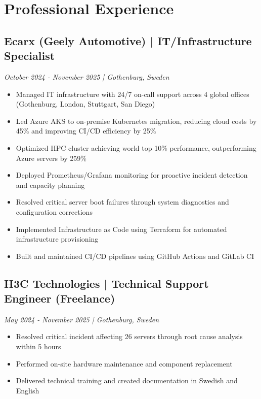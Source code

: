\documentclass[11pt,a4paper]{article}
\begin{document}
\section*{Professional Experience}

\subsection*{Ecarx (Geely Automotive) | IT/Infrastructure Specialist}
\textit{October 2024 - November 2025 | Gothenburg, Sweden}

\begin{itemize}[leftmargin=*, itemsep=2pt]
\item Managed IT infrastructure with 24/7 on-call support across 4 global offices (Gothenburg, London, Stuttgart, San Diego)
\item Led Azure AKS to on-premise Kubernetes migration, reducing cloud costs by 45\% and improving CI/CD efficiency by 25\%
\item Optimized HPC cluster achieving world top 10\% performance, outperforming Azure servers by 259\%
\item Deployed Prometheus/Grafana monitoring for proactive incident detection and capacity planning
\item Resolved critical server boot failures through system diagnostics and configuration corrections
\item Implemented Infrastructure as Code using Terraform for automated infrastructure provisioning
\item Built and maintained CI/CD pipelines using GitHub Actions and GitLab CI
\end{itemize}

\subsection*{H3C Technologies | Technical Support Engineer (Freelance)}
\textit{May 2024 - November 2025 | Gothenburg, Sweden}

\begin{itemize}[leftmargin=*, itemsep=2pt]
\item Resolved critical incident affecting 26 servers through root cause analysis within 5 hours
\item Performed on-site hardware maintenance and component replacement
\item Delivered technical training and created documentation in Swedish and English
\end{itemize}
\end{document}
